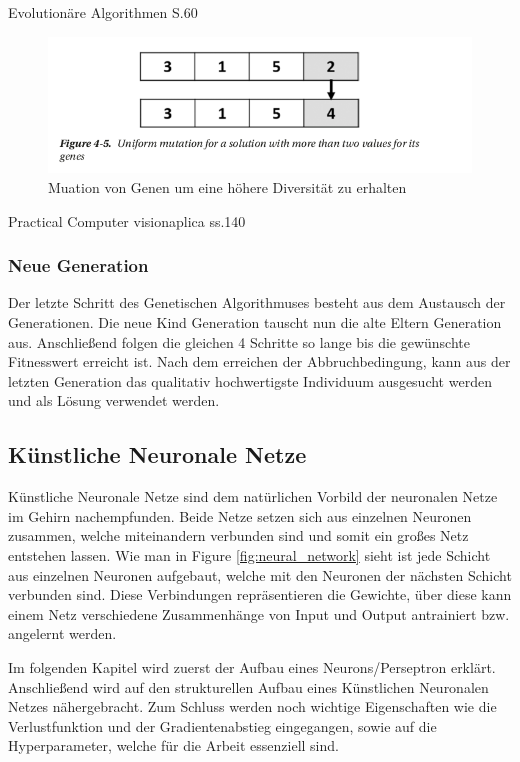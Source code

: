 Evolutionäre Algorithmen S.60


\begin{figure}[H]
  \centering  
  \includegraphics[scale=0.7]{img/mutation.png}
  \caption{Muation von Genen um eine höhere Diversität zu erhalten}
  \label{fig:chromoson_mutation}
\end{figure}

Practical Computer visionaplica ss.140
 
\subsubsection{Neue Generation}
Der letzte Schritt des Genetischen Algorithmuses besteht aus dem Austausch der Generationen. Die neue Kind Generation tauscht nun die alte Eltern Generation aus. Anschließend folgen die gleichen 4 Schritte so lange bis die gewünschte Fitnesswert erreicht ist. Nach dem erreichen der Abbruchbedingung, kann aus der letzten Generation das qualitativ hochwertigste Individuum ausgesucht werden und als Lösung verwendet werden.

\newpage

\subsection{Künstliche Neuronale Netze}

Künstliche Neuronale Netze sind dem natürlichen Vorbild der neuronalen Netze im Gehirn nachempfunden. Beide Netze setzen sich aus einzelnen Neuronen zusammen, welche miteinandern verbunden sind und somit ein großes Netz entstehen lassen. Wie man in Figure \ref{fig:neural_network} sieht ist jede Schicht aus einzelnen Neuronen aufgebaut, welche mit den Neuronen der nächsten Schicht verbunden sind. Diese Verbindungen repräsentieren die Gewichte, über diese kann einem Netz verschiedene Zusammenhänge von Input und Output antrainiert bzw. angelernt werden.



Im folgenden Kapitel wird zuerst der Aufbau eines Neurons/Perseptron erklärt. Anschließend wird auf den strukturellen Aufbau eines Künstlichen Neuronalen Netzes nähergebracht. Zum Schluss werden noch wichtige Eigenschaften wie die Verlustfunktion und der Gradientenabstieg eingegangen, sowie auf die Hyperparameter, welche für die Arbeit essenziell sind.



